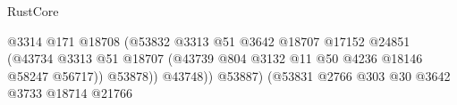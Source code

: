 \begin{lexlean}{RustCore}
\begin{coremodule}
                                                                      @3314
                                                                      @171
                                                                      @18708
                                                                      (@53832
                                                                        @3313
                                                                        @51
                                                                        @3642
                                                                        @18707
                                                                        @17152
                                                                        @24851
                                                                        (@43734
                                                                          @3313
                                                                          @51
                                                                          @18707
                                                                          (@43739
                                                                            @804
                                                                            @3132
                                                                            @11
                                                                            @50
                                                                            @4236
                                                                            @18146
                                                                            @58247
                                                                            @56717))
                                                                        @53878))
                                                                    @43748))
                                                                @53887)
                                                              (@53831
                                                                @2766
                                                                @303
                                                                @30
                                                                @3642
                                                                @3733
                                                                @18714
                                                                @21766

\end{coremodule}
\end{lexlean}
